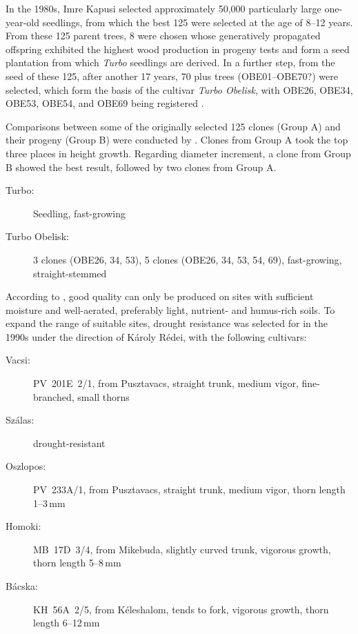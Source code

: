 In the 1980s, Imre Kapusi selected approximately 50,000 particularly large one-year-old seedlings, from which the best 125 were selected at the age of 8–12 years. From these 125 parent trees, 8 were chosen whose generatively propagated offspring exhibited the highest wood production in progeny tests and form a seed plantation from which \emph{Turbo} seedlings are derived. In a further step, from the seed of these 125, after another 17 years, 70 plus trees (OBE01–OBE70?) were selected, which form the basis of the cultivar \emph{Turbo Obelisk}, with OBE26, OBE34, OBE53, OBE54, and OBE69 being registered \citep{szabo2014turbo,nemeth2022robinie}.

Comparisons between some of the originally selected 125 clones (Group A) and their progeny (Group B) were conducted by \citet{barna2009robinieTurbo}. Clones from Group A took the top three places in height growth. Regarding diameter increment, a clone from Group B showed the best result, followed by two clones from Group A.

\begin{description}
  \item[Turbo:] Seedling, fast-growing \citep{nemeth2022robinie}
  \item[Turbo Obelisk:] 3 clones (OBE26, 34, 53), 5 clones (OBE26, 34, 53, 54, 69), fast-growing, straight-stemmed \citep{nemeth2022robinie}
\end{description}

According to \citet{redei2008robinieImprovement}, good quality can only be produced on sites with sufficient moisture and well-aerated, preferably light, nutrient- and humus-rich soils. To expand the range of suitable sites, drought resistance was selected for in the 1990s under the direction of Károly Rédei, with the following cultivars:

\begin{description}
  \item[Vacsi:] PV~201E~2/1, from Pusztavacs, straight trunk, medium vigor, fine-branched, small thorns
  \item[Szálas:] drought-resistant
  \item[Oszlopos:] PV~233A/1, from Pusztavacs, straight trunk, medium vigor, thorn length 1–3\,mm
  \item[Homoki:] MB~17D~3/4, from Mikebuda, slightly curved trunk, vigorous growth, thorn length 5–8\,mm
  \item[Bácska:] KH~56A~2/5, from Kéleshalom, tends to fork, vigorous growth, thorn length 6–12\,mm
\end{description}

